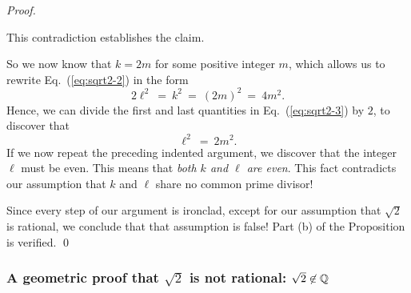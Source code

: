 \begin{proof}
\begin{description}
\smallskip

This contradiction establishes the claim.
\end{description}
So we now know that $k = 2m$ for some positive integer $m$, which allows us to rewrite Eq.~(\ref{eq:sqrt2-2}) in the form
\begin{equation}
\label{eq:sqrt2-3}
2 \ell^2 \ = \ k^2 \ = \ (2m)^2 \ = \ 4m^2.
\end{equation}
Hence, we can divide the first and last quantities in Eq.~(\ref{eq:sqrt2-3}) by $2$, to discover that
\[ \ell^2 \ = \ 2m^2. \]
If we now repeat the preceding indented argument, we discover that the integer $\ell$ must be even.  This means that {\em both $k$ and $\ell$ are even}.  This fact contradicts our assumption that $k$ and $\ell$ share no common prime divisor!

\smallskip

Since every step of our argument is ironclad, except for our assumption that $\sqrt{2}$ is rational, we conclude that that assumption is false!  Part (b) of the Proposition is verified. \qed
\end{proof}

\subsubsection{A geometric proof that $\sqrt{2}$ is not rational: $\sqrt{2} \not\in \mathbb{Q}$}
\label{sec:geom-proof-sqrt(2)}

